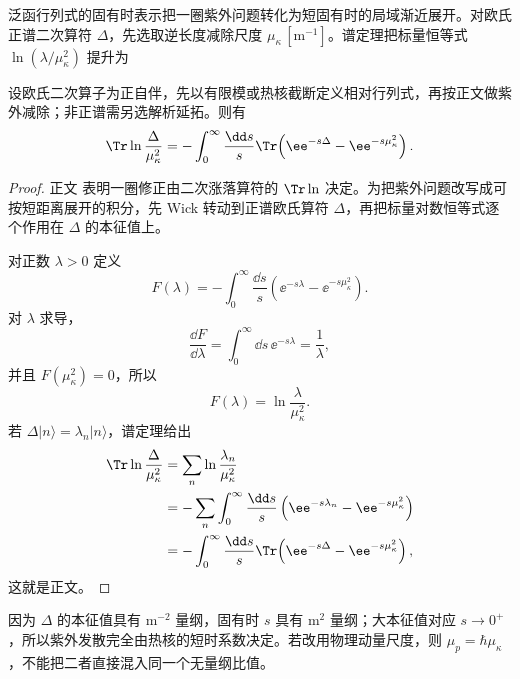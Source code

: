 泛函行列式的固有时表示把一圈紫外问题转化为短固有时的局域渐近展开。对欧氏正谱二次算符 \(\Delta\)，先选取逆长度减除尺度 \(\mu_\kappa\,[\mathrm{m^{-1}}]\)。谱定理把标量恒等式 \(\ln(\lambda/\mu_\kappa^2)\) 提升为


\begin{proposition}[正算子行列式的固有时表示]
设欧氏二次算子为正自伴，先以有限模或热核截断定义相对行列式，再按正文做紫外减除；非正谱需另选解析延拓。则有
\begin{equation}
 {
 \Tr\ln\frac{\Delta}{\mu_\kappa^2}
 =-\int_0^\infty\frac{\dd s}{s}
 \Tr\!\left(\ee^{-s\Delta}-\ee^{-s\mu_\kappa^2}\right).}
\label{eq:proper-time-functional-dp11}
\end{equation}
\end{proposition}
\begin{proof}
正文 表明一圈修正由二次涨落算符的 $\Tr\ln$ 决定。为把紫外问题改写成可按短距离展开的积分，先 Wick 转动到正谱欧氏算符 $\Delta$，再把标量对数恒等式逐个作用在 $\Delta$ 的本征值上。

对正数 $\lambda>0$ 定义
\begin{equation*}
 F(\lambda)
 =-\int_0^\infty\frac{\dd s}{s}
 \left(\ee^{-s\lambda}-\ee^{-s\mu_\kappa^2}\right).
\end{equation*}
对 $\lambda$ 求导，
\begin{equation*}
 \frac{\dd F}{\dd\lambda}
 =\int_0^\infty\dd s\,\ee^{-s\lambda}
 =\frac1\lambda,
\end{equation*}
并且 $F(\mu_\kappa^2)=0$，所以
\begin{equation*}
 F(\lambda)=\ln\frac{\lambda}{\mu_\kappa^2}.
\end{equation*}
若 $\Delta|n\rangle=\lambda_n|n\rangle$，谱定理给出
\begin{align*}
 \Tr\ln\frac{\Delta}{\mu_\kappa^2}
 &=\sum_n\ln\frac{\lambda_n}{\mu_\kappa^2}\\
 &=-\sum_n\int_0^\infty\frac{\dd s}{s}
 \left(\ee^{-s\lambda_n}-\ee^{-s\mu_\kappa^2}\right)\\
 &=-\int_0^\infty\frac{\dd s}{s}
 \Tr\!\left(\ee^{-s\Delta}-\ee^{-s\mu_\kappa^2}\right),
\end{align*}
这就是正文。
\end{proof}

因为 \(\Delta\) 的本征值具有 \(\mathrm{m^{-2}}\) 量纲，固有时 \(s\) 具有 \(\mathrm{m^2}\) 量纲；大本征值对应 \(s\to0^+\)，所以紫外发散完全由热核的短时系数决定。若改用物理动量尺度，则 \(\mu_p=\hbar\mu_\kappa\)，不能把二者直接混入同一个无量纲比值。

